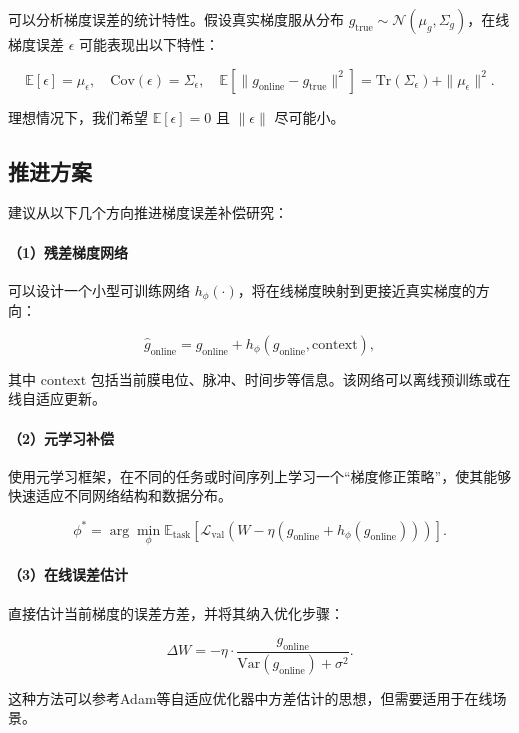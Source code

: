 \documentclass[journal,12pt,onecolumn]{IEEEtran}
\begin{document}
可以分析梯度误差的统计特性。假设真实梯度服从分布 \(g_{\text{true}} \sim \mathcal{N}(\mu_g, \Sigma_g)\)，在线梯度误差 \(\epsilon\) 可能表现出以下特性：

\[
\mathbb{E}[\epsilon] = \mu_\epsilon, \quad \text{Cov}(\epsilon) = \Sigma_\epsilon, \quad \mathbb{E}[\|g_{\text{online}} - g_{\text{true}}\|^2] = \text{Tr}(\Sigma_\epsilon) + \|\mu_\epsilon\|^2.
\]

理想情况下，我们希望 \(\mathbb{E}[\epsilon] = 0\) 且 \(\|\epsilon\|\) 尽可能小。

\subsection{推进方案}

建议从以下几个方向推进梯度误差补偿研究：

\paragraph{（1）残差梯度网络}

可以设计一个小型可训练网络 \(h_\phi(\cdot)\)，将在线梯度映射到更接近真实梯度的方向：

\[
\hat{g}_{\text{online}} = g_{\text{online}} + h_\phi(g_{\text{online}}, \text{context}),
\]

其中 \(\text{context}\) 包括当前膜电位、脉冲、时间步等信息。该网络可以离线预训练或在线自适应更新。

\paragraph{（2）元学习补偿}

使用元学习框架，在不同的任务或时间序列上学习一个“梯度修正策略”，使其能够快速适应不同网络结构和数据分布。

\[
\phi^* = \arg\min_\phi \mathbb{E}_{\text{task}} \left[ \mathcal{L}_{\text{val}}\left( W - \eta \left(g_{\text{online}} + h_\phi(g_{\text{online}})\right) \right) \right].
\]

\paragraph{（3）在线误差估计}

直接估计当前梯度的误差方差，并将其纳入优化步骤：

\[
\Delta W = -\eta \cdot \frac{g_{\text{online}}}{\text{Var}(g_{\text{online}}) + \sigma^2}.
\]

这种方法可以参考Adam等自适应优化器中方差估计的思想，但需要适用于在线场景。
\end{document}
